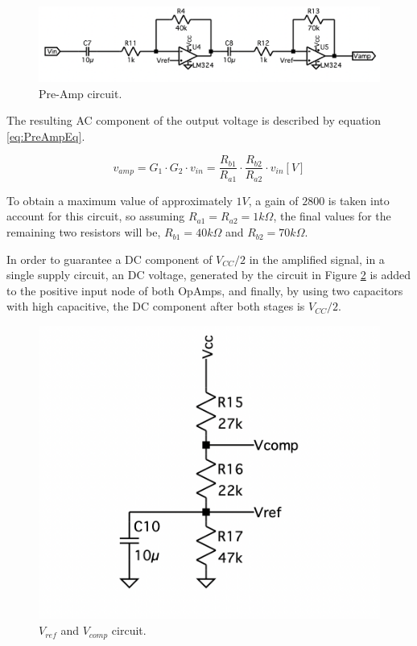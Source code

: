 \begin{figure}[H]
    \centering
    \includegraphics*[scale = 0.5]{Images/PreAmp circuit.png}
    \caption{Pre-Amp circuit.}
    \label{fig:PreAmp}
\end{figure}

The resulting AC component of the output voltage is described by equation \ref{eq:PreAmpEq}.

\begin{equation}
    v_{amp} = G_1 \cdot G_2 \cdot v_{in} = \frac{R_{b1}}{R_{a1}} \cdot \frac{R_{b2}}{R_{a2}} \cdot v_{in} [V]
    \label{eq:PreAmpEq}
\end{equation}

To obtain a maximum value of approximately $1V$, a gain of $2800$ is taken into account for this circuit, so assuming $R_{a1} = R_{a2} = 1k\Omega$, the final values for the remaining two resistors will be, $R_{b1} = 40k\Omega$ and $R_{b2} = 70k\Omega$.

In order to guarantee a DC component of $V_{CC}/2$ in the amplified signal, in a single supply circuit, an DC voltage, generated by the circuit in Figure \ref{fig:VrefVcomp} is added to the positive input node of both OpAmps, and finally, by using two capacitors with high capacitive, the DC component after both stages is $V_{CC}/2$.

\begin{figure}[H]
    \centering
    \includegraphics*[scale = 0.3]{Images/VrefVcomp.png}
    \caption{$V_{ref}$ and $V_{comp}$ circuit.}
    \label{fig:VrefVcomp}
\end{figure}

